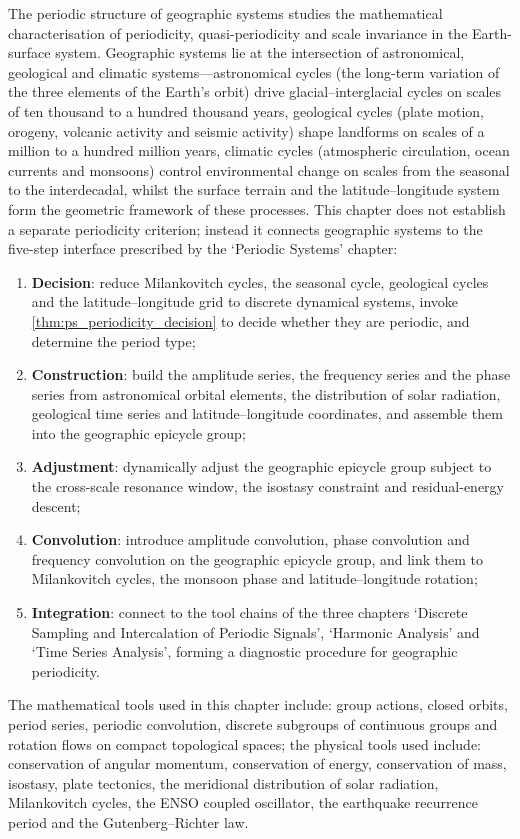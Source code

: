 \begin{remark}\label{rem:geo_chapter_positioning}
The periodic structure of geographic systems studies the mathematical characterisation of periodicity, quasi-periodicity and scale invariance in the Earth-surface system. Geographic systems lie at the intersection of astronomical, geological and climatic systems---astronomical cycles (the long-term variation of the three elements of the Earth's orbit) drive glacial--interglacial cycles on scales of ten thousand to a hundred thousand years, geological cycles (plate motion, orogeny, volcanic activity and seismic activity) shape landforms on scales of a million to a hundred million years, climatic cycles (atmospheric circulation, ocean currents and monsoons) control environmental change on scales from the seasonal to the interdecadal, whilst the surface terrain and the latitude--longitude system form the geometric framework of these processes. This chapter does not establish a separate periodicity criterion; instead it connects geographic systems to the five-step interface prescribed by the `Periodic Systems' chapter:
\begin{enumerate}[label=(\arabic*)]
    \item \textbf{Decision}: reduce Milankovitch cycles, the seasonal cycle, geological cycles and the latitude--longitude grid to discrete dynamical systems, invoke \cref{thm:ps_periodicity_decision} to decide whether they are periodic, and determine the period type;
    \item \textbf{Construction}: build the amplitude series, the frequency series and the phase series from astronomical orbital elements, the distribution of solar radiation, geological time series and latitude--longitude coordinates, and assemble them into the geographic epicycle group;
    \item \textbf{Adjustment}: dynamically adjust the geographic epicycle group subject to the cross-scale resonance window, the isostasy constraint and residual-energy descent;
    \item \textbf{Convolution}: introduce amplitude convolution, phase convolution and frequency convolution on the geographic epicycle group, and link them to Milankovitch cycles, the monsoon phase and latitude--longitude rotation;
    \item \textbf{Integration}: connect to the tool chains of the three chapters `Discrete Sampling and Intercalation of Periodic Signals', `Harmonic Analysis' and `Time Series Analysis', forming a diagnostic procedure for geographic periodicity.
\end{enumerate}
The mathematical tools used in this chapter include: group actions, closed orbits, period series, periodic convolution, discrete subgroups of continuous groups and rotation flows on compact topological spaces; the physical tools used include: conservation of angular momentum, conservation of energy, conservation of mass, isostasy, plate tectonics, the meridional distribution of solar radiation, Milankovitch cycles, the ENSO coupled oscillator, the earthquake recurrence period and the Gutenberg--Richter law.
\end{remark}

